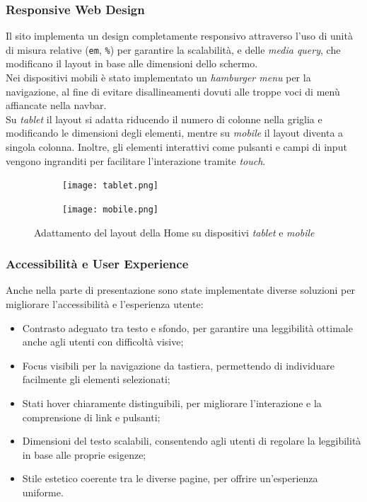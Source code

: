 \documentclass[a4paper, 12pt]{article}
\begin{document}
\begin{justify}
\subsubsection{Responsive Web Design}

Il sito implementa un design completamente responsivo attraverso l'uso di unità di misura relative (\texttt{em}, \texttt{\%}) per garantire la scalabilità, e delle \textit{media query}, che modificano il layout in base alle dimensioni dello schermo.\\
Nei dispositivi mobili è stato implementato un \textit{hamburger menu} per la navigazione, al fine di evitare disallineamenti dovuti alle troppe voci di menù affiancate nella navbar.\\
Su \textit{tablet} il layout si adatta riducendo il numero di colonne nella griglia e modificando le dimensioni degli elementi, mentre su \textit{mobile} il layout diventa a singola colonna. Inoltre, gli elementi interattivi come pulsanti e campi di input vengono ingranditi per facilitare l'interazione tramite \textit{touch}.

\begin{figure}[h]
    \centering
    \begin{subfigure}{0.55\linewidth}
        \centering
        \texttt{[image: tablet.png]}
    \end{subfigure}
    \hfill
    \begin{subfigure}{0.35\linewidth}
        \centering
        \texttt{[image: mobile.png]}
    \end{subfigure}
    \caption{Adattamento del layout della Home su dispositivi \textit{tablet} e \textit{mobile}}
\end{figure}

\newpage
\subsubsection{Accessibilità e User Experience}

Anche nella parte di presentazione sono state implementate diverse soluzioni per migliorare l'accessibilità e l'esperienza utente:  
\begin{itemize}
    \item Contrasto adeguato tra testo e sfondo, per garantire una leggibilità ottimale anche agli utenti con difficoltà visive;
    \item Focus visibili per la navigazione da tastiera, permettendo di individuare facilmente gli elementi selezionati;
    \item Stati hover chiaramente distinguibili, per migliorare l'interazione e la comprensione di link e pulsanti;
    \item Dimensioni del testo scalabili, consentendo agli utenti di regolare la leggibilità in base alle proprie esigenze;
    \item Stile estetico coerente tra le diverse pagine, per offrire un'esperienza uniforme.
\end{itemize}


\end{justify}
\end{document}
